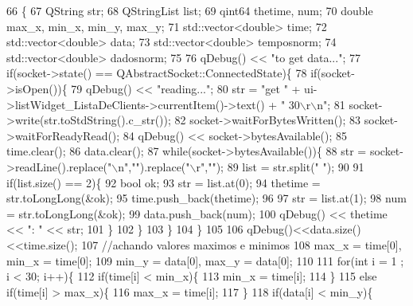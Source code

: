 \begin{DoxyCode}
66                                          \{
67     QString str;
68     QStringList list;
69     qint64 thetime, num;
70     \textcolor{keywordtype}{double} max\_x, min\_x, min\_y, max\_y;
71     std::vector<double> time;
72     std::vector<double> data;
73     std::vector<double> temposnorm;
74     std::vector<double> dadosnorm;
75 
76     qDebug() << \textcolor{stringliteral}{"to get data..."};
77     \textcolor{keywordflow}{if}(socket->state() == QAbstractSocket::ConnectedState)\{
78         \textcolor{keywordflow}{if}(socket->isOpen())\{
79             qDebug() << \textcolor{stringliteral}{"reading..."};
80             str = \textcolor{stringliteral}{"get "} + ui->listWidget\_ListaDeClients->currentItem()->text() + \textcolor{stringliteral}{" 30\(\backslash\)r\(\backslash\)n"};
81             socket->write(str.toStdString().c\_str());
82             socket->waitForBytesWritten();
83             socket->waitForReadyRead();
84             qDebug() << socket->bytesAvailable();
85             time.clear();
86             data.clear();
87             \textcolor{keywordflow}{while}(socket->bytesAvailable())\{
88                 str = socket->readLine().replace(\textcolor{stringliteral}{"\(\backslash\)n"},\textcolor{stringliteral}{""}).replace(\textcolor{stringliteral}{"\(\backslash\)r"},\textcolor{stringliteral}{""});
89                 list = str.split(\textcolor{stringliteral}{" "});
90 
91                 \textcolor{keywordflow}{if}(list.size() == 2)\{
92                     \textcolor{keywordtype}{bool} ok;
93                     str = list.at(0);
94                     thetime = str.toLongLong(&ok);
95                     time.push\_back(thetime);
96 
97                     str = list.at(1);
98                     num = str.toLongLong(&ok);
99                     data.push\_back(num);
100                     qDebug() << thetime << \textcolor{stringliteral}{": "} << str;
101                 \}
102             \}
103         \}
104     \}
105 
106     qDebug()<<data.size()<<time.size();
107     \textcolor{comment}{//achando valores maximos e minimos}
108     max\_x = time[0], min\_x = time[0];
109     min\_y = data[0], max\_y = data[0];
110 
111     \textcolor{keywordflow}{for}(\textcolor{keywordtype}{int} i = 1 ; i < 30; i++)\{
112         \textcolor{keywordflow}{if}(time[i] < min\_x)\{
113             min\_x = time[i];
114         \}
115         \textcolor{keywordflow}{else} \textcolor{keywordflow}{if}(time[i] > max\_x)\{
116             max\_x = time[i];
117         \}
118         \textcolor{keywordflow}{if}(data[i] < min\_y)\{

\end{DoxyCode}
